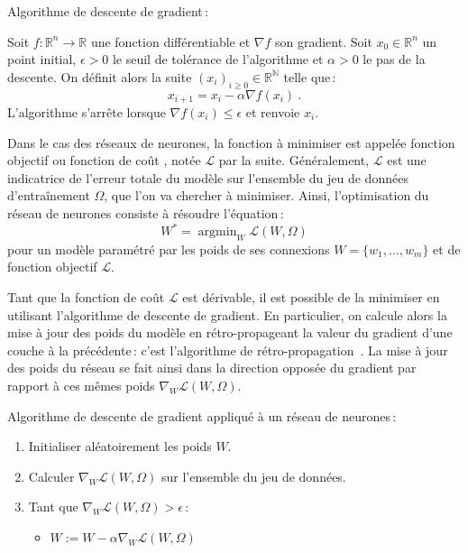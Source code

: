 \begin{definition}
  \label{eq:sgd}
  Algorithme de descente de gradient\,:

  Soit $f : \mathbb{R}^n \rightarrow \mathbb{R}$ une fonction différentiable et $\nabla f$ son gradient. Soit $x_0 \in \mathbb{R}^n$ un point initial, $\epsilon > 0$ le seuil de tolérance de l'algorithme et $\alpha > 0$ le pas de la descente. On définit alors la suite $(x_i)_{i \ge 0} \in \mathbb{R}^\mathbb{N}$ telle que\,:
  $$x_{i+1} = x_i - \alpha \nabla f(x_i)~.$$
  L'algorithme s'arrête lorsque $\nabla f(x_i) \le \epsilon$ et renvoie $x_i$.
\end{definition}

\def\L{\mathcal{L}}

Dans le cas des réseaux de neurones, la fonction à minimiser est appelée \og fonction objectif \fg ou \og fonction de coût \fg, notée $\L$ par la suite. Généralement, $\L$ est une indicatrice de l'erreur totale du modèle sur l'ensemble du jeu de données d'entraînement $\Omega$, que l'on va chercher à minimiser. Ainsi, l'optimisation du réseau de neurones consiste à résoudre l'équation\,:
\begin{equation}
W^* = \operatorname{argmin}_W \L(W, \Omega)
\end{equation}
pour un modèle paramétré par les poids de ses connexions $W = \{w_1,\dots,w_m\}$ et de fonction objectif $\L$.

Tant que la fonction de coût $\L$ est dérivable, il est possible de la minimiser en utilisant l'algorithme de descente de gradient. En particulier, on calcule alors la mise à jour des poids du modèle en rétro-propageant la valeur du gradient d'une couche à la précédente\,: c'est l'algorithme de rétro-propagation~\cite{werbos_beyond_1975,lecun_efficient_1998,rumelhart_learning_1986}. La mise à jour des poids du réseau se fait ainsi dans la direction opposée du gradient par rapport à ces mêmes poids $\nabla_W \L(W, \Omega)$.

\begin{definition}
  Algorithme de descente de gradient appliqué à un réseau de neurones\,:
  \begin{enumerate}
    \item Initialiser aléatoirement les poids $W$.
    \item Calculer $\nabla_W \L(W, \Omega)$ sur l'ensemble du jeu de données.
    \item Tant que $\nabla_W \L(W, \Omega) > \epsilon$\,:
      \begin{itemize}
          \item $W := W - \alpha \nabla_W \L(W, \Omega)$
      \end{itemize}
  \end{enumerate}
\end{definition}

